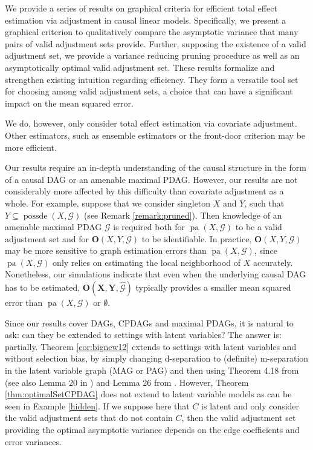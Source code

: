 \documentclass[11pt,a4paper]{article}
\theoremstyle{definition}
\theoremstyle{remark}
\DeclareMathOperator{\pa}{pa}
\DeclareMathOperator{\possde}{possde}
\newcommand{\mpdag}{maximal PDAG}
\newcommand{\g}[1][G]{\mathcal{#1}}
\newcommand{\opt}[2][X,Y]{\mathbf{O}(#1,#2)}
\newcommand{\optb}[2][X,Y]{\mathbf{O}(\mathbf{#1},#2)}
\begin{document}
We provide a series of results on graphical criteria for efficient total effect estimation via adjustment in causal linear models. Specifically, we present a graphical criterion to qualitatively compare the asymptotic variance that many pairs of valid adjustment sets provide. Further, supposing the existence of a valid adjustment set, we provide a variance reducing pruning procedure as well as an asymptotically optimal valid adjustment set. These results formalize and strengthen existing intuition regarding efficiency. They form a versatile tool set for choosing among valid adjustment sets, a choice that can have a significant impact on the mean squared error.

We do, however, only consider total effect estimation via covariate adjustment. Other estimators, such as ensemble estimators or the front-door criterion \citep{hayashi2014estimating} may be more efficient.

Our results require an in-depth understanding of the causal structure in the form of a causal DAG or an amenable \mpdag{}. However, our results are not considerably more affected by this difficulty than covariate adjustment as a whole. For example, suppose that we consider singleton $X$ and $Y$, such that $Y \subseteq \possde(X,\g)$ (see Remark \ref{remark:pruned}). Then knowledge of an amenable \mpdag{} $\g$ is required both for $\pa(X,\g)$ to be a valid adjustment set and for $\opt{\g}$ to be identifiable. In practice, $\opt{\g}$ may be more sensitive to graph estimation errors than $\pa(X,\g)$, since $\pa(X,\g)$ only relies on estimating the local neighborhood of $X$ accurately. Nonetheless, our simulations indicate that even when the underlying causal DAG has to be estimated, $\optb{\hat{\g}}$ typically provides a smaller mean squared error than $\pa(X,\g)$ or $\emptyset$. 

Since our results cover DAGs, CPDAGs and maximal PDAGs, it is natural to ask: can they be extended to settings with latent variables? The answer is: partially. Theorem \ref{cor:bignew12} extends to settings with latent variables and without selection bias, by simply changing d-separation to (definite) m-separation \citep{RichardsonSpirtes02,zhang2008causal} in the latent variable graph (MAG or PAG) and then using Theorem 4.18 from \citet{RichardsonSpirtes02} (see also Lemma 20 in \citet{zhang2008causal}) and Lemma 26 from \citet{zhang2008causal}. However, Theorem \ref{thm:optimalSetCPDAG} does not extend to latent variable models as can be seen in Example \ref{hidden}. If we suppose here that $C$ is latent and only consider the valid adjustment sets that do not contain $C$, then the valid adjustment set providing the optimal asymptotic variance depends on the edge coefficients and error variances.
\end{document}
